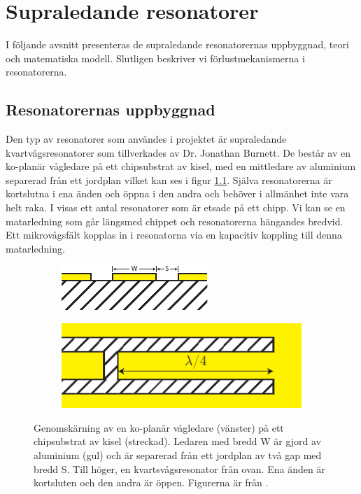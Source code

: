 \documentclass[main.tex]{subfiles}
\begin{document}
\chapter{Supraledande resonatorer}
I följande avsnitt presenteras de supraledande resonatorernas uppbyggnad, teori och matematiska modell. Slutligen beskriver vi förlustmekanismerna i resonatorerna.

\section{Resonatorernas uppbyggnad}

Den typ av resonatorer som användes i projektet är supraledande kvartvågsresonatorer som tillverkades av Dr. Jonathan Burnett. De består av en ko-planär vågledare på ett chipsubstrat av kisel, med en mittledare av aluminium separerad från ett jordplan \cite{Boehme2016} vilket kan ses i figur \ref{fig:chipsubstrat}. Själva resonatorerna är kortslutna i ena änden och öppna i den andra och behöver i allmänhet inte vara helt raka. I  visas ett antal resonatorer som är etsade på ett chipp. Vi kan se en matarledning som går längsmed chippet och resonatorerna hängandes bredvid. Ett mikrovågsfält kopplas in i resonatorna via en kapacitiv koppling till denna matarledning.

\begin{figure}[H]
\centering
\begin{subfigure}{0.45\textwidth}
  \centering
  \includegraphics[width=0.8\linewidth]{figure/chipsubstrat.pdf}
\end{subfigure}%
\begin{subfigure}{.45\textwidth}
  \centering
  \includegraphics[width=0.8\linewidth]{figure/chipsubstrat2.pdf}
\end{subfigure}
\caption{Genomskärning av en ko-planär vågledare (vänster) på ett chipsubstrat av kisel (streckad). Ledaren med bredd W är gjord av aluminium (gul) och är separerad från ett jordplan av två gap med bredd S. Till höger, en kvartsvågsresonator från ovan. Ena änden är kortsluten och den andra är öppen. Figurerna är från \cite[fig. 2.1]{Boehme2016}.}
\label{fig:chipsubstrat}
\end{figure}
\end{document}
